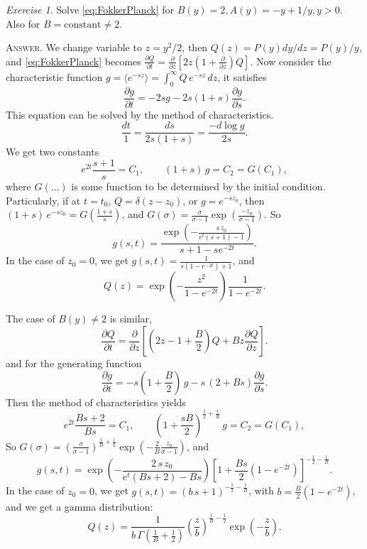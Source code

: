 \documentclass{book}
\numberwithin{equation}{section}
\theoremstyle{plain}
\theoremstyle{definition}
\theoremstyle{remark}
\theoremstyle{BoldStyle}
\newtheorem{exercise}{Exercise}
\numberwithin{exercise}{section}
\newcommand{\answer}[1]{{\color{DarkBlue}\footnotesize \textsc{Answer.} #1}}
\begin{document}
\begin{exercise}
  Solve \eqref{eq:FokkerPlanck} for $B(y) = 2, A(y) = -y + 1/y, y > 0$.
  Also for $B = \mathrm{constant} \ne 2$.

  \answer{We change variable to $z = y^2/2$,
    then $Q(z) = P(y) dy/dz = P(y)/y$, and \eqref{eq:FokkerPlanck}
    becomes
    $\frac{ \partial Q } { \partial t}
    = \frac{ \partial } { \partial z }
    \left[ 2 z \left(1 + \frac{ \partial } { \partial z } \right) Q \right].$
    Now consider the characteristic function
    $g = \langle e^{-sz} \rangle = \int_0^\infty Q \, e^{-sz} \, dz$,
    it satisfies
    $$
    \frac{ \partial g }{ \partial t } = -2sg -2s(1+s) \frac{ \partial g }{ \partial s}.
    $$
    This equation can be solved by the method of characteristics.
    $$
    \frac{dt}{1} = \frac{ds}{2s(1+s)}  = \frac{-d\log g} { 2s }.
    $$
    We get two constants
    $$
    e^{2t} \frac{s + 1}{s} = C_1,
    \qquad
    (1+s) \, g = C_2 = G(C_1),
    $$
    where $G(\dots)$ is some function to be determined by the initial condition.
    Particularly, if at $t = t_0$, $Q = \delta(z - z_0)$, or $g = e^{-s z_0}$,
    then $(1+s)\, e^{-sz_0} = G\left(\frac{1+s}{s}\right)$, and
    $G(\sigma) = \frac{\sigma}{\sigma-1} \exp\left(\frac{-z_0}{\sigma - 1}\right)$.
    So
    $$
    g(s, t) = \frac{\exp\left( - \frac{ s \, z_0 } { e^t(s+1) - 1} \right) }
    {s + 1 - s e^{-2t}}.
    $$
    In the case of $z_0 = 0$, we get $g(s, t) = \frac{1}{s(1-e^{-2t}) + 1}$,
    and
    $$Q(z) = \exp\left(-\frac{z^2}{1-e^{-2t}}\right)\frac{1}{1 - e^{-2t}}.$$

    The case of $B(y) \ne 2$ is similar,
    $$
    \frac{ \partial Q } { \partial t}
    = \frac{ \partial } { \partial z }
    \left[ \left(2 z - 1 + \frac B 2 \right) Q
    + B z \frac{ \partial Q } { \partial z } \right].
    $$
    and for the generating function
    $$
      \frac{ \partial g }{ \partial t } = -s\left(1+ \frac B 2 \right) \, g
      -s \, (2+Bs) \frac{ \partial g }{ \partial s}.
    $$
    Then the method of characteristics yields
    $$
    e^{2t} \frac{Bs + 2}{Bs} = C_1,
    \qquad
    \left(1+\frac{sB}{2}\right)^{\frac{1}{2} + \frac{1}{B}} \, g = C_2 = G(C_1),
    $$
    So
    $G(\sigma) = \left( \frac{\sigma}{\sigma-1} \right)^{\frac{1}{B} + \frac{1}{2}}
    \exp\left(-\frac{2}{B}\frac{z_0}{\sigma - 1}\right)$, and
    $$
    g(s, t) = \exp\left( - \frac{ 2 \, s \, z_0 } { e^t(Bs+2) - Bs} \right)
    \left[1 + \frac{Bs}{2}\left(1 - e^{-2t}\right) \right]^{-\frac{1}{2} -\frac{1}{B}}.
    $$
    In the case of $z_0 = 0$, we get $g(s, t) = (b \, s + 1)^{-\frac{1}{2} -\frac{1}{B}}$,
    with $b = \frac{B}{2}(1 - e^{-2t})$,
    and we get a gamma distribution:
    $$
    Q(z) =
    \frac{1}{b \, \Gamma\left(\frac{1}{B}+\frac{1}{2}\right)}
    \left(\frac z b\right)^{\frac 1 B- \frac 1 2}
    \exp\left( - \frac z b \right).
    $$
  }
\end{exercise}
\end{document}
